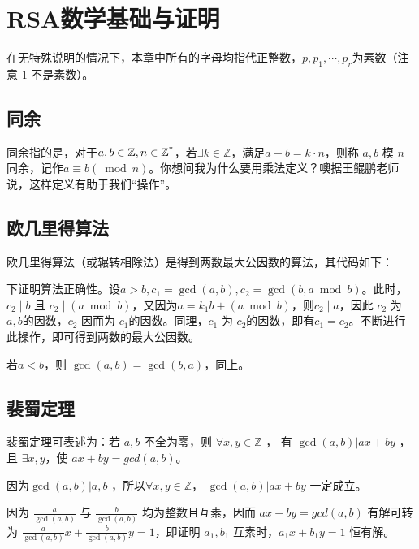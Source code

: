 \documentclass[a4paper]{article}         %
\begin{document}
\section{RSA数学基础与证明} \label{RSA数学基础与证明}

在无特殊说明的情况下，本章中所有的字母均指代正整数，$p,p_1,\cdots,p_r$为素数（注意 1 不是素数）。

\subsection{同余}

同余指的是，对于$a, b \in \mathbb{Z}, n \in \mathbb{Z\textsuperscript{*}}$，若$\exists k \in \mathbb{Z}$，满足$a - b = k \cdot n$，则称 $a, b$ 模 $n$ 同余，记作$a \equiv b (\bmod n)$。你想问我为什么要用乘法定义？噢据王鲲鹏老师说，这样定义有助于我们“操作”。

\subsection{欧几里得算法}

欧几里得算法（或辗转相除法）是得到两数最大公因数的算法，其代码如下：



下证明算法正确性。设$a > b, c_1 = \gcd(a, b), c_2 = \gcd(b, a \bmod b)$。此时，$c_2 \mid b$ 且 $c_2 \mid (a \bmod b)$，又因为$a = k_1b + (a \bmod b)$，则$c_2 \mid a$，因此 $c_2$ 为 $a, b$的因数，$c_2$ 因而为 $c_1$的因数。同理，$c_1$ 为 $c_2$的因数，即有$c_1 = c_2$。不断进行此操作，即可得到两数的最大公因数。

若$a < b$，则 $\gcd(a, b) = \gcd(b, a)$，同上。

\subsection{裴蜀定理} \label{裴蜀定理}

裴蜀定理可表述为：若 $a, b$ 不全为零，则 $\forall x, y \in \mathbb{Z}$ ， 有 $\gcd(a, b) \vert ax + by$ ，且 $\exists x, y$，使 $ax + by = gcd(a, b)$。

因为$\gcd(a, b) \vert a, b$ ，所以$\forall x, y \in \mathbb{Z}$， $\gcd(a, b) \vert ax + by$ 一定成立。 

因为 $\frac{a}{\gcd(a, b)}$ 与 $\frac{b}{\gcd(a, b)}$ 均为整数且互素，因而 $ax + by = gcd(a, b)$ 有解可转为 $\frac{a}{\gcd(a, b)} x + \frac{b}{\gcd(a, b)} y = 1$，即证明 $a_1, b_1$ 互素时，$a_1 x + b_1 y = 1$ 恒有解。
\end{document}
